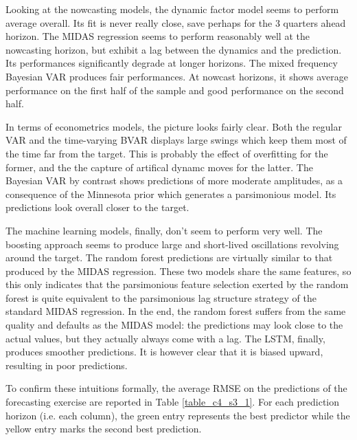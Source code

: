 Looking at the nowcasting models, the dynamic factor model seems to perform average overall. Its fit is never really close, save perhaps for the 3 quarters ahead horizon. The MIDAS regression seems to perform reasonably well at the nowcasting horizon, but exhibit a lag between the dynamics and the prediction. Its performances significantly degrade at longer horizons. The mixed frequency Bayesian VAR produces fair performances. At nowcast horizons, it shows average performance on the first half of the sample and good performance on the second half.

In terms of econometrics models, the picture looks fairly clear. Both the regular VAR and the time-varying BVAR displays large swings which keep them most of the time far from the target. This is probably the effect of overfitting for the former, and the the capture of artifical dynamc moves for the latter. The Bayesian VAR by contrast shows predictions of more moderate amplitudes, as a consequence of the Minnesota prior which generates a parsimonious model. Its predictions look overall closer to the target.

The machine learning models, finally, don't seem to perform very well. The boosting approach seems to produce large and short-lived oscillations revolving around the target. The random forest predictions are virtually similar to that produced by the MIDAS regression. These two models share the same features, so this only indicates that the parsimonious feature selection exerted by the random forest is quite equivalent to the parsimonious lag structure strategy of the standard MIDAS regression. In the end, the random forest suffers from the same quality and defaults as the MIDAS model: the predictions may look close to the actual values, but they actually always come with a lag. The LSTM, finally, produces smoother predictions. It is however clear that it is biased upward, resulting in poor predictions.

To confirm these intuitions formally, the average RMSE on the predictions of the forecasting exercise are reported in Table \ref{table_c4_s3_1}. For each prediction horizon (i.e. each column), the green entry represents the best predictor while the yellow entry marks the second best prediction. \vspace{2mm}

